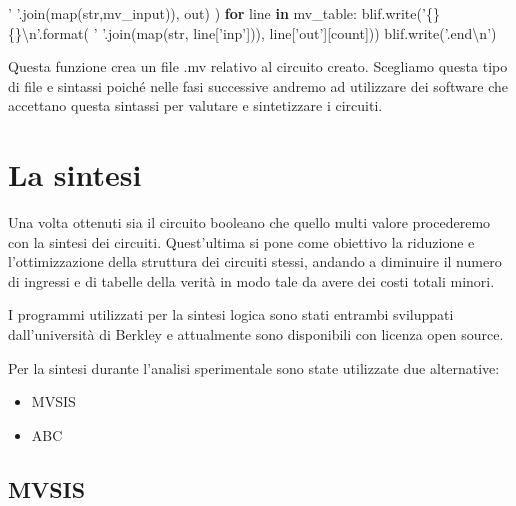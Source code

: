 \documentclass[italian,]{book}
\newenvironment{Shaded}{\begin{snugshade}}{\end{snugshade}}
\newcommand{\BuiltInTok}[1]{#1}
\newcommand{\CharTok}[1]{\textcolor[rgb]{0.31,0.60,0.02}{#1}}
\newcommand{\ControlFlowTok}[1]{\textcolor[rgb]{0.13,0.29,0.53}{\textbf{#1}}}
\newcommand{\KeywordTok}[1]{\textcolor[rgb]{0.13,0.29,0.53}{\textbf{#1}}}
\newcommand{\NormalTok}[1]{#1}
\newcommand{\SpecialCharTok}[1]{\textcolor[rgb]{0.00,0.00,0.00}{#1}}
\newcommand{\StringTok}[1]{\textcolor[rgb]{0.31,0.60,0.02}{#1}}
\providecommand{\tightlist}{%
  \setlength{\itemsep}{0pt}\setlength{\parskip}{0pt}}
\begin{document}
\begin{Shaded}
\begin{Highlighting}[]
        \StringTok{' '}\NormalTok{.join(}\BuiltInTok{map}\NormalTok{(}\BuiltInTok{str}\NormalTok{,mv_input)), out)}
\NormalTok{      )}
    \ControlFlowTok{for}\NormalTok{ line }\KeywordTok{in}\NormalTok{ mv_table:}
\NormalTok{      blif.write(}\StringTok{'}\SpecialCharTok{\{\}}\StringTok{ }\SpecialCharTok{\{\}}\CharTok{\textbackslash{}n}\StringTok{'}\NormalTok{.}\BuiltInTok{format}\NormalTok{(}
        \StringTok{' '}\NormalTok{.join(}\BuiltInTok{map}\NormalTok{(}\BuiltInTok{str}\NormalTok{, line[}\StringTok{'inp'}\NormalTok{])), line[}\StringTok{'out'}\NormalTok{][count]))}
\NormalTok{  blif.write(}\StringTok{'.end}\CharTok{\textbackslash{}n}\StringTok{'}\NormalTok{)}
\end{Highlighting}
\end{Shaded}

Questa funzione crea un file .mv relativo al circuito creato. Scegliamo questa tipo di file e sintassi poiché nelle fasi successive andremo ad utilizzare dei software che accettano questa sintassi per valutare e sintetizzare i circuiti.

\newpage

\hypertarget{la-sintesi}{%
\section{La sintesi}\label{la-sintesi}}

Una volta ottenuti sia il circuito booleano che quello multi valore procederemo con la sintesi dei circuiti. Quest'ultima si pone come obiettivo la riduzione e l'ottimizzazione della struttura dei circuiti stessi, andando a diminuire il numero di ingressi e di tabelle della verità in modo tale da avere dei costi totali minori.

I programmi utilizzati per la sintesi logica sono stati entrambi sviluppati dall'università di Berkley e attualmente sono disponibili con licenza open source.

Per la sintesi durante l'analisi sperimentale sono state utilizzate due alternative:

\begin{itemize}
\tightlist
\item
  MVSIS
\item
  ABC
\end{itemize}

\hypertarget{mvsis-1}{%
\subsection{MVSIS}\label{mvsis-1}}
\end{document}

